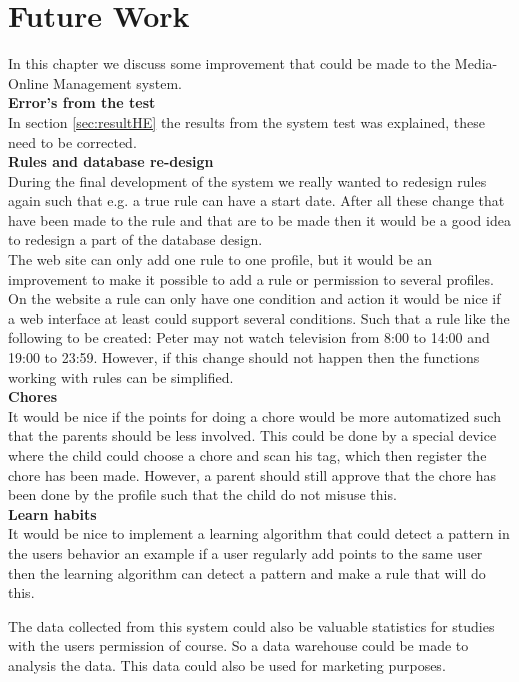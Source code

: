 \chapter{Future Work}
In this chapter we discuss some improvement that could be made to the Media-Online Management system.\\

\textbf{Error's from the test}\\
In section \vref{sec:resultHE} the results from the system test was explained, these need to be corrected.\\
 
\textbf{Rules and database re-design}\\
During the final development of the system we really wanted to redesign rules again such that e.g. a true rule can have a start date. After all these change that have been made to the rule and that are to be made then it would be a good idea to redesign a part of the database design. \\

The web site can only add one rule to one profile, but it would be an improvement to make it possible to add a rule or permission to several profiles. On the website a rule can only have one condition and action it would be nice if a web interface at least could support several conditions. Such that a rule like the following to be created: Peter may not watch television from 8:00 to 14:00 and 19:00 to 23:59. However, if this change should not happen then the functions working with rules can be simplified. \\

\textbf{Chores}\\
It would be nice if the points for doing a chore would be more automatized such that the parents should be less involved. This could be done by a special device where the child could choose a chore and scan his tag, which then register the chore has been made. However, a parent should still approve that the chore has been done by the profile such that the child do not misuse this.\\

\textbf{Learn habits}\\
It would be nice to implement a learning algorithm that could detect a pattern in the users behavior an example if a user regularly add points to the same user then the learning algorithm can detect a pattern and make a rule that will do this. 

The data collected from this system could also be valuable statistics for studies with the users permission of course. So a data warehouse could be made to analysis the data. This data could also be used for marketing purposes. \\

